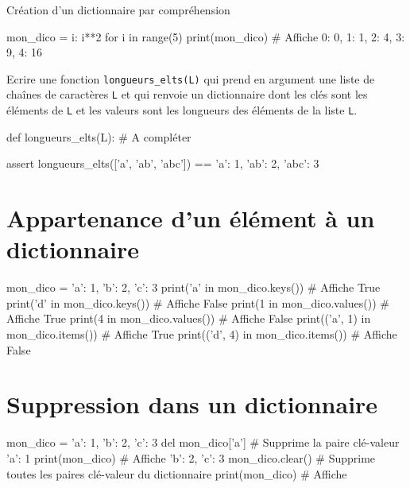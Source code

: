 \begin{easybox}{Création d'un dictionnaire par compréhension}{}
	\begin{CodePythontexAlt}[Largeur=1\linewidth,Centre,PremLigne=1]{}
mon_dico = {i: i**2 for i in range(5)}
print(mon_dico) # Affiche {0: 0, 1: 1, 2: 4, 3: 9, 4: 16}
\end{CodePythontexAlt}
\end{easybox}

\begin{exercice_cours}{}
 Ecrire une fonction \texttt{longueurs\_elts(L)} qui prend en argument une liste de chaînes de caractères \texttt{L} et qui renvoie un dictionnaire dont les clés sont les éléments de \texttt{L} et les valeurs sont les longueurs des éléments de la liste \texttt{L}.
 
 
 \begin{CodePythontexAlt}[Largeur=1\linewidth,Centre,PremLigne=1, Lignes=false,]{}
def longueurs_elts(L):
	# A compléter
	

	






assert longueurs_elts(['a', 'ab', 'abc']) == {'a': 1, 'ab': 2, 'abc': 3}
\end{CodePythontexAlt}
\end{exercice_cours}


\section{Appartenance d'un élément à un dictionnaire}

	\begin{CodePythontexAlt}[Largeur=1\linewidth,Centre,PremLigne=1]{}
mon_dico = {'a': 1, 'b': 2, 'c': 3}
print('a' in mon_dico.keys())  # Affiche True
print('d' in mon_dico.keys())  # Affiche False
print(1 in mon_dico.values())  # Affiche True
print(4 in mon_dico.values())  # Affiche False
print(('a', 1) in mon_dico.items())  # Affiche True
print(('d', 4) in mon_dico.items())  # Affiche False
\end{CodePythontexAlt}

\section{Suppression dans un dictionnaire}

	\begin{CodePythontexAlt}[Largeur=1\linewidth,Centre,PremLigne=1]{}
mon_dico = {'a': 1, 'b': 2, 'c': 3}
del mon_dico['a']  # Supprime la paire clé-valeur 'a': 1
print(mon_dico)  # Affiche {'b': 2, 'c': 3}
mon_dico.clear()  # Supprime toutes les paires clé-valeur du dictionnaire
print(mon_dico)  # Affiche {}
\end{CodePythontexAlt}


